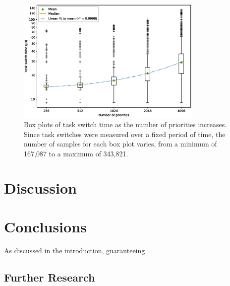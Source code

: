 \documentclass[twoside]{uva-inf-bachelor-thesis}
\begin{document}
\begin{figure}[htpb]
    \centering
    \includegraphics[width=0.8\textwidth]{boxplot.eps}
    \caption{Box plots of task switch time as the number of priorities increases. Since task switches were measured over a fixed period of time, the number of samples for each box plot varies, from a minimum of 167,087 to a maximum of 343,821.}
    \label{fig:prioboxplot}
\end{figure}

\chapter{Discussion}

\chapter{Conclusions}

As discussed in the introduction, guaranteeing

\section{Further Research}


\printbibliography
\end{document}
